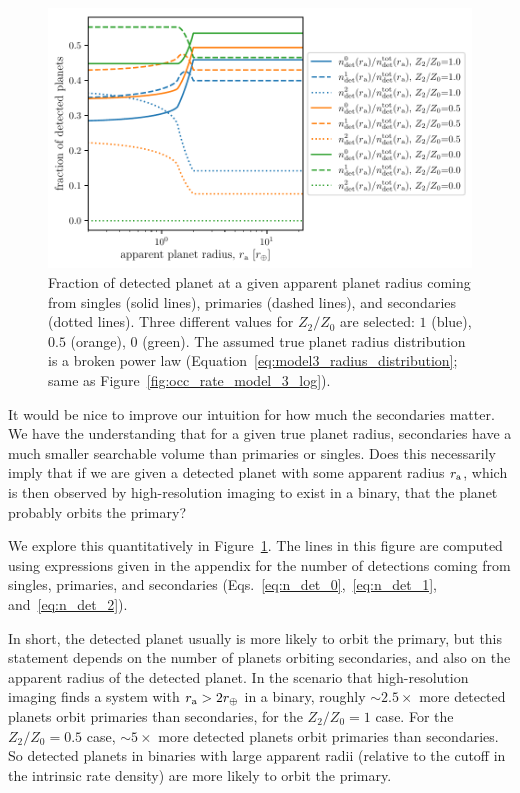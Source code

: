 \documentclass[12pt,modern]{aastex61}
\renewcommand{\a}{_{\rm a}}
\begin{document}
\begin{figure}[!t]
    \centering
    \includegraphics[width=\textwidth]{figures/ndet_vs_radius_logx_model_3_fraclines_rpu_22.5_manyZs.pdf}
    \caption{
        Fraction of detected planet at a given apparent planet radius
        coming from singles (solid lines), primaries (dashed lines),
        and secondaries (dotted lines).  Three different values for
        $Z_2/Z_0$ are selected: $1$ (blue), $0.5$ (orange), $0$
        (green).  The assumed true planet radius distribution is a
        broken power law
        (Equation~\ref{eq:model3_radius_distribution}; same as
        Figure~\ref{fig:occ_rate_model_3_log}).
    }
    \label{fig:frac_model_3}
\end{figure}

It would be nice to improve our intuition for how much the secondaries
matter.  We have the understanding that for a given true planet
radius, secondaries have a much smaller searchable volume than
primaries or singles.  Does this necessarily imply that if we are
given a detected planet with some apparent radius $r\a$, which is then
observed by high-resolution imaging to exist in a binary, that the
planet probably orbits the primary?

We explore this quantitatively in Figure~\ref{fig:frac_model_3}.  The
lines in this figure are computed using expressions given in the
appendix for the number of detections coming from singles, primaries,
and secondaries (Eqs.~\ref{eq:n_det_0},~\ref{eq:n_det_1},
and~\ref{eq:n_det_2}).

In short, the detected planet usually is more likely to orbit the
primary, but this statement depends on the number of planets orbiting
secondaries, and also on the apparent radius of the detected planet.
In the scenario that high-resolution imaging finds a system with $r\a
> 2r_\oplus$ in a binary, roughly $\sim\! 2.5\times$ more detected
planets orbit primaries than secondaries, for the $Z_2/Z_0=1$ case.
For the $Z_2/Z_0=0.5$ case, $\sim\! 5\times$ more detected planets
orbit primaries than secondaries.  So detected planets in binaries
with large apparent radii (relative to the cutoff in the intrinsic
rate density) are more likely to orbit the primary.
\end{document}
